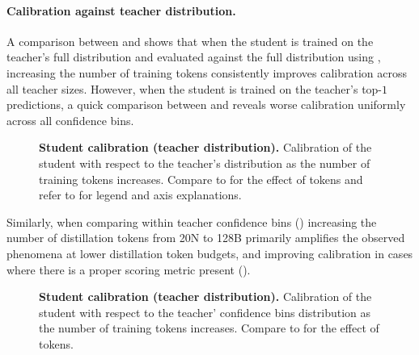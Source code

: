 \paragraph{Calibration against teacher distribution.} A comparison between  and  shows that when the student is trained on the teacher's full distribution and evaluated against the full distribution using , increasing the number of training tokens consistently improves calibration across all teacher sizes. 
However, when the student is trained on the teacher's top-$1$ predictions, a quick comparison between  and  reveals worse calibration uniformly across all confidence bins.

\begin{figure}[h]
  \centering
  \hfill
  \caption{\textbf{Student calibration (teacher distribution).} Calibration of the student with respect to the teacher's distribution as the number of training tokens increases. Compare to  for the effect of tokens and refer to  for legend and axis explanations.}
  \label{fig:calibration-student-tdist-128b}
\end{figure}

Similarly, when comparing within teacher confidence bins ()
increasing the number of distillation tokens from 20N to 128B primarily amplifies the observed phenomena at lower distillation token budgets,
and improving calibration in cases where there is a proper scoring metric present ().

\begin{figure}[h]
	\centering
	\hfill
	\caption{\textbf{Student calibration (teacher distribution).} Calibration of the student with respect to the teacher' confidence bins distribution as the number of training tokens increases. Compare to  for the effect of tokens.}
	\label{fig:calibration-teacher-tdist-128b}
\end{figure}

